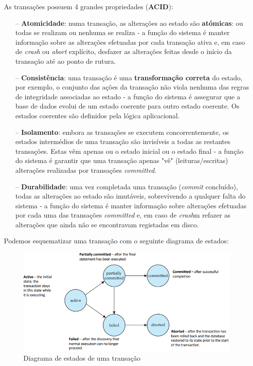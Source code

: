 \documentclass[oneside]{book}
\theoremstyle{definition}
\begin{document}
As transações possuem 4 grandes propriedades (\textbf{ACID}):
\begin{itemize}
    \itemsep0cm
    \item[--] \textbf{Atomicidade}: numa transação, as alterações ao estado são \textbf{atómicas}: ou todas se realizam ou nenhuma se realiza - a função do sistema é manter informação sobre as alterações efetuadas por cada transação ativa e, em caso de \textit{crash} ou \textit{abort} explícito, desfazer as alterações feitas desde o início da transação até ao ponto de rutura.
    \item[--] \textbf{Consistência}: uma transação é uma \textbf{transformação correta} do estado, por exemplo, o conjunto das ações da transação não viola nenhuma das regras de integridade associadas ao estado - a função do sistema é assegurar que a base de dados evolui de um estado coerente para outro estado coerente. Os estados coerentes são definidos pela lógica aplicacional.
    \item[--] \textbf{Isolamento}: embora as transações se executem concorrentemente, os estados intermédios de uma transação são invisíveis a todas as restantes transações. Estas vêm apenas ou o estado inicial ou o estado final - a função do sistema é garantir que uma transação apenas "vê" (leituras/escritas) alterações realizadas por transações \textit{committed}.
    \item[--] \textbf{Durabilidade}: uma vez completada uma transação (\textit{commit} concluído), todas as alterações ao estado são imutáveis, sobrevivendo a qualquer falta do sistema - a função do sistema é manter informação sobre alterações efetuadas por cada uma das transações \textit{committed} e, em caso de \textit{crash}m refazer as alterações que ainda não se encontravam registadas em disco.
\end{itemize}

Podemos esquematizar uma transação com o seguinte diagrama de estados:
\begin{figure}[H]
    \centering
    \includegraphics[scale = 0.4]{cap_transct/diagrama_estados_trans.png}
    \caption{Diagrama de estados de uma transação}
\end{figure}
\end{document}
